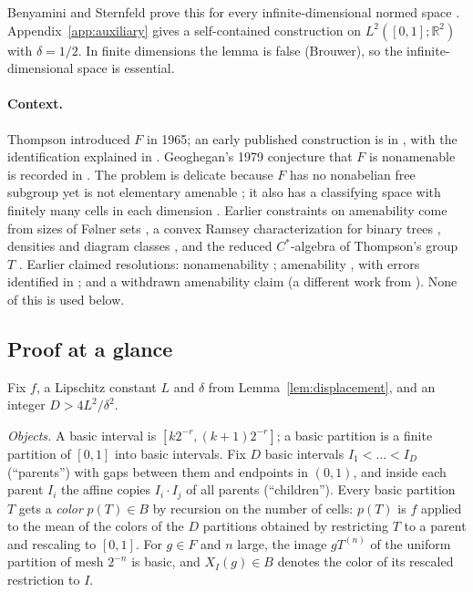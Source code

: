 \documentclass[11pt]{article}
\newcommand{\R}{\mathbb R}
\theoremstyle{definition}
\numberwithin{equation}{section}
\begin{document}
Benyamini and Sternfeld prove this for every infinite-dimensional normed
space \cite[Theorem, part~(3), p.~439]{BenyaminiSternfeld1983}.
Appendix~\ref{app:auxiliary} gives a self-contained construction on
$L^2([0,1];\R^2)$ with $\delta=1/2$. In finite dimensions the lemma is
false (Brouwer), so the infinite-dimensional space is essential.

\paragraph{Context.}
Thompson introduced $F$ in 1965; an early published construction is in
\cite{McKenzieThompson1973}, with the identification explained in
\cite[pp.~215--216]{CannonFloydParry1996}. Geoghegan's 1979 conjecture
that $F$ is nonamenable is recorded in
\cite[p.~227]{CannonFloydParry1996}. The problem is delicate because $F$
has no nonabelian free subgroup \cite[Theorem~3.1]{BrinSquier1985} yet is
not elementary amenable \cite[Theorem~4.10]{CannonFloydParry1996}; it
also has a classifying space with finitely many cells in each dimension
\cite{BrownGeoghegan1984}. Earlier constraints on amenability come from
sizes of F\o lner sets \cite[Theorem~1.1]{MooreFolner2013}, a convex
Ramsey characterization for binary trees \cite[Theorem~3.1]{Moore2013},
densities and diagram classes \cite{Guba2025Density,Guba2026}, and the
reduced $C^*$-algebra of Thompson's group $T$
\cite[Theorem~5.5]{HaagerupOlesen2017}. Earlier claimed resolutions:
nonamenability \cite{Akhmedov2021}; amenability \cite{Shavgulidze2009},
with errors identified in \cite{Moore2011Critique}; and a withdrawn
amenability claim \cite{Moore2012Withdrawn} (a different work from
\cite{Moore2013}). None of this is used below.

\subsection{Proof at a glance}

Fix $f$, a Lipschitz constant $L$ and $\delta$ from
Lemma~\ref{lem:displacement}, and an integer $D>4L^2/\delta^2$.

\emph{Objects.} A basic interval is $[k2^{-r},(k+1)2^{-r}]$; a basic
partition is a finite partition of $[0,1]$ into basic intervals. Fix
$D$ basic intervals $I_1<\dots<I_D$ (``parents'') with gaps between
them and endpoints in $(0,1)$, and inside each parent $I_i$ the affine
copies $I_i\cdot I_j$ of all parents (``children''). Every basic
partition $T$ gets a \emph{color} $p(T)\in B$ by recursion on the number
of cells: $p(T)$ is $f$ applied to the mean of the colors of the $D$
partitions obtained by restricting $T$ to a parent and rescaling to
$[0,1]$. For $g\in F$ and $n$ large, the image $gT^{(n)}$ of the uniform
partition of mesh $2^{-n}$ is basic, and $X_I(g)\in B$ denotes the color
of its rescaled restriction to $I$.
\end{document}
